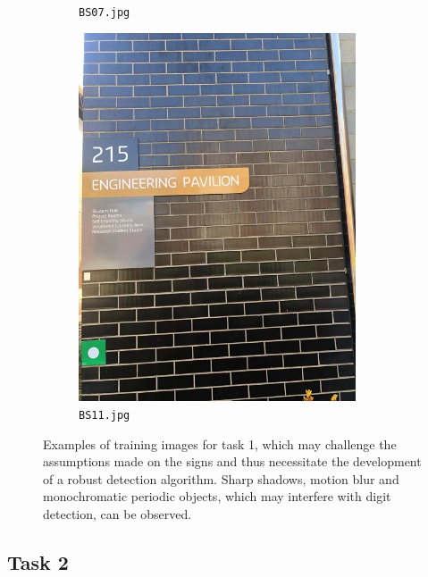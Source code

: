 \documentclass{article}
\begin{document}
\begin{figure}[h]
\begin{subfigure}[h]{0.22\textwidth}
    \caption[BS07]{
      \lstinline{BS07.jpg}
    }
    \label{fig:bs07}
  \end{subfigure}
  \begin{subfigure}[h]{0.22\textwidth}
    \centering
    \includegraphics[width=0.9\textwidth]{../train/task1/BS11}
    \caption[BS11]{
      \lstinline{BS11.jpg}
    }
    \label{fig:bs11}
  \end{subfigure}

  \caption[Task 1 - Edge Cases]{
    Examples of training images for task 1, which may challenge the assumptions
    made on the signs and thus necessitate the development of a robust detection
    algorithm.
    Sharp shadows, motion blur and monochromatic periodic objects, which may
    interfere with digit detection, can be observed.
  }
  \label{fig:problem-1-outlier}
\end{figure}

\subsection{Task 2}
\label{sec:problem-2}
\end{document}
